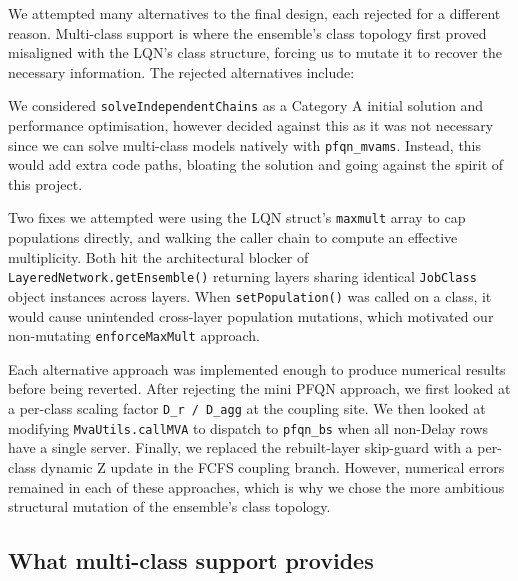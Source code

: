 We attempted many alternatives to the final design, each rejected for a different reason. Multi-class support is where the ensemble's class topology first proved misaligned with the LQN's class structure, forcing us to mutate it to recover the necessary information. The rejected alternatives include:

We considered \texttt{solveIndependentChains} as a Category A initial solution and performance optimisation, however decided against this as it was not necessary since we can solve multi-class models natively with \texttt{pfqn\_mvams}. Instead, this would add extra code paths, bloating the solution and going against the spirit of this project.

Two fixes we attempted were using the LQN struct's \texttt{maxmult} array to cap populations directly, and walking the caller chain to compute an effective multiplicity. Both hit the architectural blocker of \texttt{LayeredNetwork.getEnsemble()} returning layers sharing identical \texttt{JobClass} object instances across layers. When \texttt{setPopulation()} was called on a class, it would cause unintended cross-layer population mutations, which motivated our non-mutating \texttt{enforceMaxMult} approach.

Each alternative approach was implemented enough to produce numerical results before being reverted. After rejecting the mini PFQN approach, we first looked at a per-class scaling factor \texttt{D\_r / D\_agg} at the coupling site. We then looked at modifying \texttt{MvaUtils.callMVA} to dispatch to \texttt{pfqn\_bs} when all non-Delay rows have a single server. Finally, we replaced the rebuilt-layer skip-guard with a per-class dynamic Z update in the FCFS coupling branch. However, numerical errors remained in each of these approaches, which is why we chose the more ambitious structural mutation of the ensemble's class topology. 

\subsection{What multi-class support provides}

